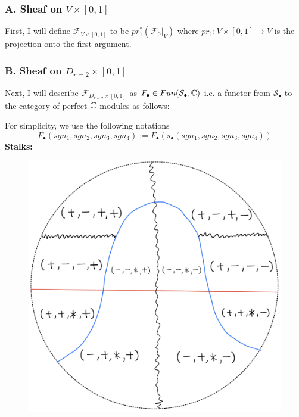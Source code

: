 \subsubsection{A. Sheaf on $V\times [0,1]$}
First, I will define $\mathscr{F}_{V\times [0,1]}$ to be $pr_1^*(\mathscr{F}_0|_V)$ where $pr_1 : V \times [0,1] \rightarrow V$ is the projection onto the first argument.
\subsubsection{B. Sheaf on $D_{r=2}\times [0,1]$}
Next, I will describe $\mathscr{F}_{D_{r=2}\times [0,1]}$ as $F_\bullet \in Fun(\mathcal{S}_\bullet,\mathbb{C})$ i.e. a functor from $\mathcal{S}_\bullet$ to the category of perfect $\mathbb{C}$-modules as follows: 

For simplicity, we use the following notations
\[
F_\bullet(sgn_1,sgn_2,sgn_3,sgn_4):=F_\bullet(s_\bullet(sgn_1,sgn_2,sgn_3,sgn_4))
\]
\textbf{Stalks:}
\begin{figure}[H]
    \centering
    \includegraphics[scale = 0.45]{diagrams/cobord'2/30.png} 
    \caption{}
    \label{fig:your-label}
\end{figure}
